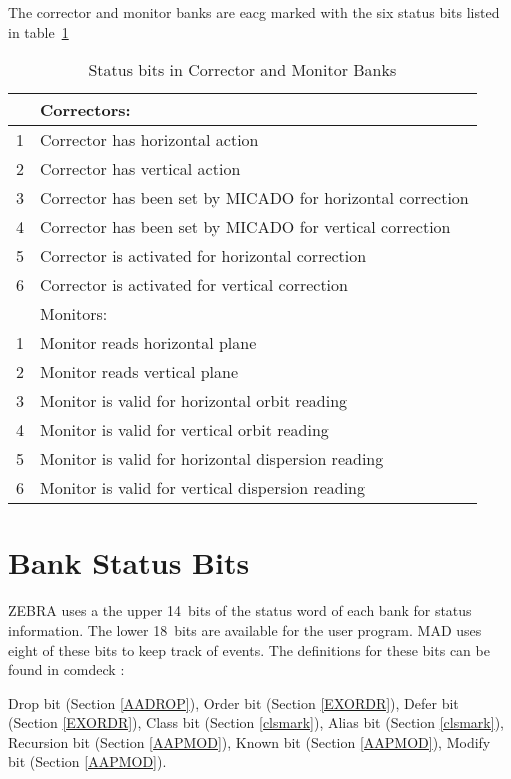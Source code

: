 The corrector and monitor banks are eacg marked with the six status
bits listed in table~\ref{T-com}
\begin{table}[ht]
\centering
\caption{Status bits in Corrector and Monitor Banks}
\label{T-com}
\centering
\begin{tabular}{|r|p{}|}
\hline
 &Correctors:\\
\hline
1&Corrector has horizontal action\\
2&Corrector has vertical action\\
3&Corrector has been set by MICADO for horizontal correction\\
4&Corrector has been set by MICADO for vertical correction\\
5&Corrector is activated for horizontal correction\\
6&Corrector is activated for vertical correction\\
\hline
 &Monitors:\\
\hline
1&Monitor reads horizontal plane\\
2&Monitor reads vertical plane\\
3&Monitor is valid for horizontal orbit reading\\
4&Monitor is valid for vertical orbit reading\\
5&Monitor is valid for horizontal dispersion reading\\
6&Monitor is valid for vertical dispersion reading\\
\hline
\end{tabular}
\end{table}

\section{Bank Status Bits}
\label{Smark}
ZEBRA uses a the upper 14~bits of the status word of each bank for 
status information.
The lower 18~bits are available for the user program.
MAD uses eight of these bits to keep track of events.
The definitions for these bits can be found in comdeck :
\begin{mylist}
 Drop bit (Section \ref{AADROP}),
 Order bit (Section \ref{EXORDR}),
 Defer bit (Section \ref{EXORDR}),
 Class bit (Section \ref{clsmark}),
 Alias bit (Section \ref{clsmark}),
 Recursion bit (Section \ref{AAPMOD}),
 Known bit (Section \ref{AAPMOD}),
 Modify bit (Section \ref{AAPMOD}).
\end{mylist}


